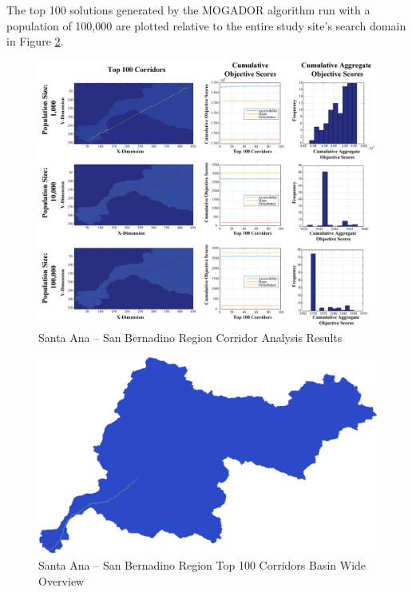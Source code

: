 The top 100 solutions generated by the MOGADOR algorithm run with a population of 100,000 are plotted relative to the entire study site's search domain in Figure \ref{fig:SASBsolutionOverview}.
    
        \begin{figure}[!h]
            \begin{center}
            \includegraphics[width=6in]{figures/SanBernadino_PathwayResults.png}   
            \caption{Santa Ana -- San Bernadino Region Corridor Analysis Results}
            \label{fig:SASBresults}
            \end{center}
        \end{figure}

        \begin{figure}[!h]
            \begin{center}
            \includegraphics[width=5.5in]{figures/SanBernadino_PathwayLarge.png}   
            \caption{Santa Ana -- San Bernadino Region Top 100 Corridors Basin Wide Overview}
            \label{fig:SASBsolutionOverview}
            \end{center}
        \end{figure}
        

